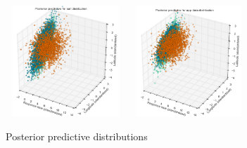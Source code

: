 \documentclass[twoside]{article}
\theoremstyle{theorem}
\theoremstyle{theorem}
\theoremstyle{theorem}
\theoremstyle{lemma}
\theoremstyle{definition}
\theoremstyle{example}
\begin{document}
\begin{figure}[h!]
\begin{center}
\includegraphics[width=45mm, height=42mm]{callposteriorpredictive}
\includegraphics[width=45mm, height=42mm]{appposteriorpredictive}
\caption{Posterior predictive distributions}
\label{pred}
\end{center}
\end{figure}
\end{document}
